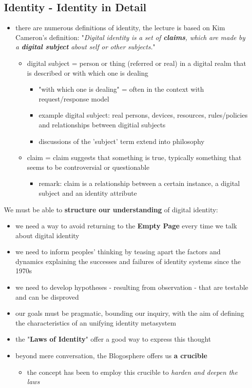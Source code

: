 \documentclass[11pt]{article}
\begin{document}
\subsection{Identity - Identity in Detail}
\label{sec:org68be60f}
\begin{itemize}
\item there are numerous definitions of identity, the lecture is based on Kim Cameron's definition: "\emph{Digital identity is a set of \textbf{claims}, which are made by a \textbf{digital subject} about self or other subjects.}"
\begin{itemize}
\item digital subject = person or thing (referred or real) in a digital realm that is described or with which one is dealing
\begin{itemize}
\item "with which one is dealing" = often in the context with request/response model
\item example digital subject: real persons, devices, resources, rules/policies and relationships between digitial subjects
\item discussions of the 'subject' term extend into philosophy
\end{itemize}
\item claim = claim suggests that something is true, typically something that seems to be controversial or questionable
\begin{itemize}
\item remark: claim is a relationship between a certain instance, a digital subject and an identity attribute
\end{itemize}
\end{itemize}
\end{itemize}

We must be able to \textbf{structure our understanding} of digital identity:
\begin{itemize}
\item we need a way to avoid returning to the \textbf{Empty Page} every time we talk about digital identity
\item we need to inform peoples' thinking by teasing apart the factors and dynamics explaining the successes and failures of identity systems since the 1970s
\item we need to develop hypotheses - resulting from observation - that are testable and can be disproved
\item our goals must be pragmatic, bounding our inquiry, with the aim of defining the characteristics of an unifying identity metasystem
\item the "\textbf{Laws of Identity}" offer a good way to express this thought
\item beyond mere conversation, the Blogosphere offers us \textbf{a crucible}
\begin{itemize}
\item the concept has been to employ this crucible to \emph{harden and deepen the laws}
\end{itemize}
\end{itemize}
\end{document}
